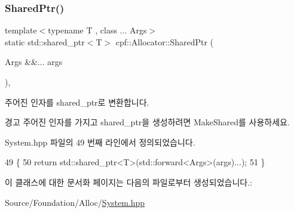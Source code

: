 \subsubsection{\texorpdfstring{Shared\+Ptr()}{SharedPtr()}}
{\footnotesize\ttfamily template$<$typename T , class ... Args$>$ \\
static std\+::shared\+\_\+ptr$<$T$>$ cpf\+::\+Allocator\+::\+Shared\+Ptr (\begin{DoxyParamCaption}\item[{Args \&\&...}]{args }\end{DoxyParamCaption})\hspace{0.3cm}{\ttfamily [inline]}, {\ttfamily [static]}}

주어진 인자를 shared\+\_\+ptr로 변환합니다. \begin{DoxyWarning}{경고}
주어진 인자를 가지고 shared\+\_\+ptr을 생성하려면 Make\+Shared를 사용하세요. 
\end{DoxyWarning}


System.\+hpp 파일의 49 번째 라인에서 정의되었습니다.


\begin{DoxyCode}
49                                                           \{
50             \textcolor{keywordflow}{return} std::shared\_ptr<T>(std::forward<Args>(args)...);
51         \}
\end{DoxyCode}


이 클래스에 대한 문서화 페이지는 다음의 파일로부터 생성되었습니다.\+:\begin{DoxyCompactItemize}
\item 
Source/\+Foundation/\+Alloc/\hyperlink{_system_8hpp}{System.\+hpp}\end{DoxyCompactItemize}
